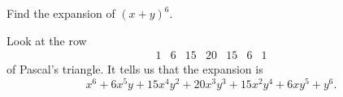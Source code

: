 \documentclass[../main.tex]{subfiles}
\begin{document}
Find the expansion of $(x + y)^{6}$.

\solution
Look at the row
\[
	\begin{matrix}1&6&15&20&15&6&1\end{matrix}
\]
of Pascal's triangle.
It tells us that the expansion is
\[
	x^6 + 6x^5y + 15x^4y^2 + 20x^3y^3 + 15x^2y^4 + 6xy^5 + y^6.
\]
\end{document}
